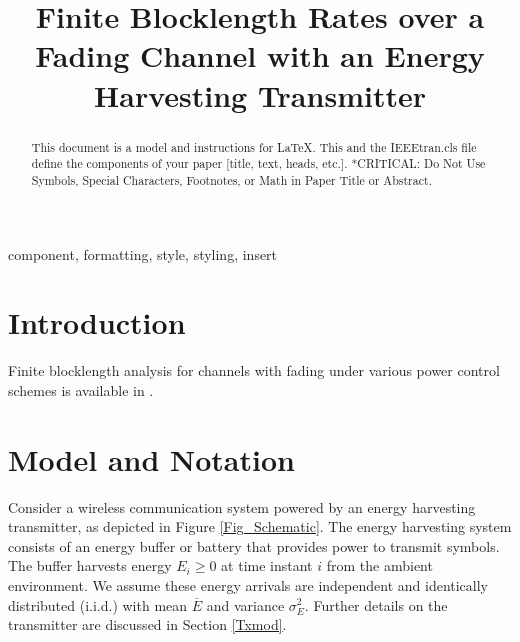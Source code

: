 \documentclass[conference]{IEEEtran}
\begin{document}
\title{Finite Blocklength Rates over a Fading Channel with an Energy Harvesting Transmitter\\
}

\author{
\and
{}
\and
{}
}

\maketitle

\begin{abstract}
This document is a model and instructions for \LaTeX.
This and the IEEEtran.cls file define the components of your paper [title, text, heads, etc.]. *CRITICAL: Do Not Use Symbols, Special Characters, Footnotes, 
or Math in Paper Title or Abstract.
\end{abstract}

\begin{IEEEkeywords}
component, formatting, style, styling, insert
\end{IEEEkeywords}

\section{Introduction}
Finite blocklength analysis for channels with fading under various power control schemes is available in \cite{deeks2018}.
\section{Model and Notation}
Consider a wireless communication system powered by an energy harvesting transmitter, as depicted in Figure \ref{Fig_Schematic}. The energy harvesting system consists of an energy buffer or battery that provides power to transmit symbols. The buffer harvests energy $E_i\geq 0$ at time instant $i$ from the ambient environment. We assume these energy arrivals are independent and identically distributed (i.i.d.) with mean $\overline{E}$ and variance $\sigma_E^2$. Further details on the transmitter are discussed in Section \ref{Txmod}.
\end{document}
